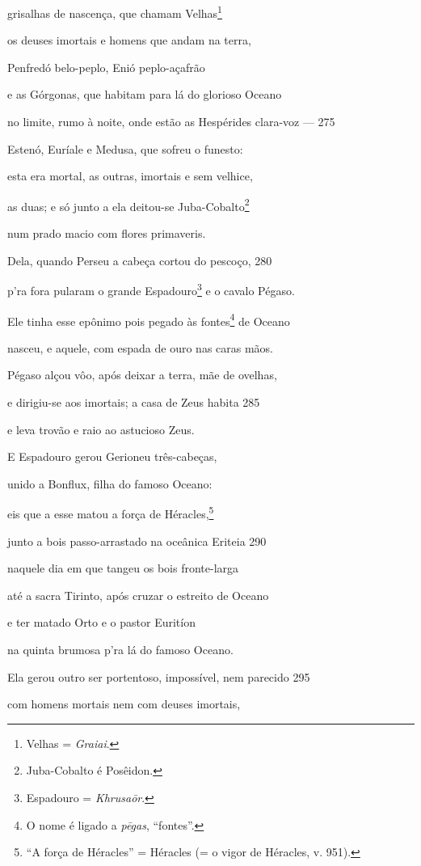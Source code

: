 grisalhas de nascença, que chamam Velhas\footnote{Velhas = \emph{Graiai}.}

os deuses imortais e homens que andam na terra,

Penfredó belo-peplo, Enió peplo-açafrão

e as Górgonas, que habitam para lá do glorioso Oceano

no limite, rumo à noite, onde estão as Hespérides \qb{}clara-voz --- \num{275}

Estenó, Euríale e Medusa, que sofreu o funesto:

esta era mortal, as outras, imortais e sem velhice,

as duas; e só junto a ela deitou-se Juba-Cobalto\footnote{Juba-Cobalto é Posêidon.}

num prado macio com flores primaveris.

Dela, quando Perseu a cabeça cortou do pescoço, \num{280}

p'ra fora pularam o grande Espadouro\footnote{Espadouro = \emph{Khrusaōr}.} e o cavalo Pégaso.

Ele tinha esse epônimo pois pegado às fontes\footnote{O nome é ligado a \emph{pēgas}, ``fontes''.} de Oceano

nasceu, e aquele, com espada de ouro nas caras mãos.

Pégaso alçou vôo, após deixar a terra, mãe de ovelhas,

e dirigiu-se aos imortais; a casa de Zeus habita \num{285}

e leva trovão e raio ao astucioso Zeus.

E Espadouro gerou Gerioneu três-cabeças,

unido a Bonflux, filha do famoso Oceano:

eis que a esse matou a força de Héracles,\footnote{``A força de Héracles'' = Héracles (= o vigor de Héracles, v. 951).}

junto a bois passo-arrastado na oceânica Eriteia \num{290}

naquele dia em que tangeu os bois fronte-larga

até a sacra Tirinto, após cruzar o estreito de Oceano

e ter matado Orto e o pastor Euritíon

na quinta brumosa p'ra lá do famoso Oceano.

\quad{}Ela gerou outro ser portentoso, impossível, nem parecido \num{295}

com homens mortais nem com deuses imortais,

